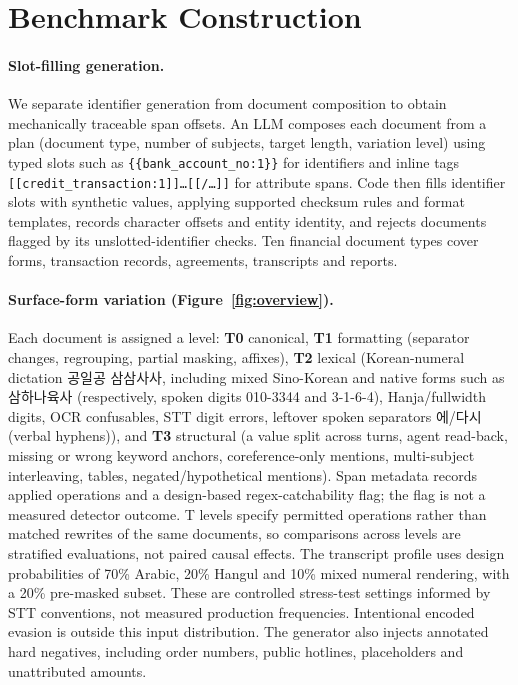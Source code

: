 \section{Benchmark Construction}
\label{sec:benchmark}

\paragraph{Slot-filling generation.}
We separate identifier generation from document composition to obtain mechanically traceable span offsets. An LLM composes each document from a plan (document type, number of subjects, target length, variation level) using typed slots such as \texttt{\{\{bank\_account\_no:1\}\}} for identifiers and inline tags \texttt{[[credit\_transaction:1]]…[[/…]]} for attribute spans. Code then fills identifier slots with synthetic values, applying supported checksum rules and format templates, records character offsets and entity identity, and rejects documents flagged by its unslotted-identifier checks. Ten financial document types cover forms, transaction records, agreements, transcripts and reports.

\paragraph{Surface-form variation (Figure~\ref{fig:overview}).}
Each document is assigned a level: \textbf{T0} canonical, \textbf{T1} formatting (separator changes, regrouping, partial masking, affixes), \textbf{T2} lexical (Korean-numeral dictation \textup{공일공 삼삼사사}, including mixed Sino-Korean and native forms such as \textup{삼하나육사} (respectively, spoken digits 010-3344 and 3-1-6-4), Hanja/fullwidth digits, OCR confusables, STT digit errors, leftover spoken separators \textup{에}/\textup{다시} (verbal hyphens)), and \textbf{T3} structural (a value split across turns, agent read-back, missing or wrong keyword anchors, coreference-only mentions, multi-subject interleaving, tables, negated/hypothetical mentions). Span metadata records applied operations and a design-based regex-catchability flag; the flag is not a measured detector outcome. T levels specify permitted operations rather than matched rewrites of the same documents, so comparisons across levels are stratified evaluations, not paired causal effects. The transcript profile uses design probabilities of 70\% Arabic, 20\% Hangul and 10\% mixed numeral rendering, with a 20\% pre-masked subset. These are controlled stress-test settings informed by STT conventions, not measured production frequencies. Intentional encoded evasion is outside this input distribution. The generator also injects annotated hard negatives, including order numbers, public hotlines, placeholders and unattributed amounts.

